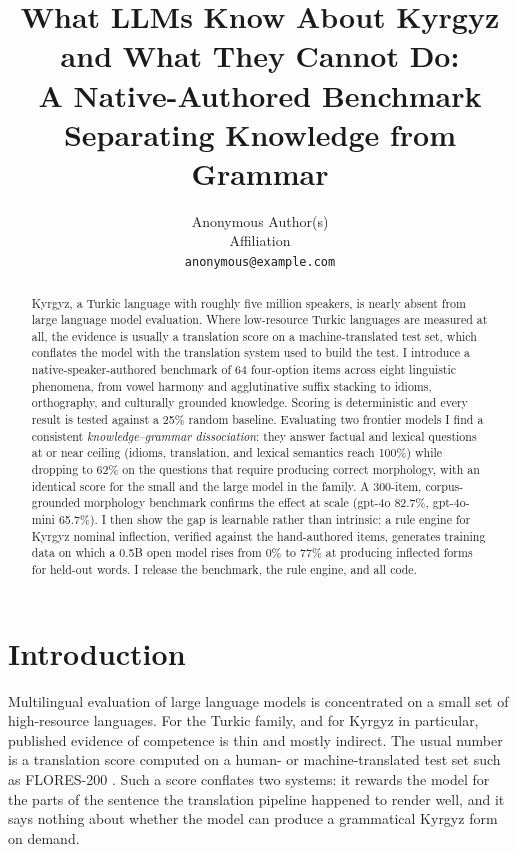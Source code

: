 \documentclass{article}
\title{What LLMs Know About Kyrgyz and What They Cannot Do:\\
A Native-Authored Benchmark Separating Knowledge from Grammar}
\author{%
  Anonymous Author(s)\\
  Affiliation\\
  \texttt{anonymous@example.com}\\
}
\begin{document}
\maketitle


\begin{abstract}
Kyrgyz, a Turkic language with roughly five million speakers, is nearly absent from
large language model evaluation. Where low-resource Turkic languages are measured at
all, the evidence is usually a translation score on a machine-translated test set,
which conflates the model with the translation system used to build the test.
I introduce a native-speaker-authored benchmark of 64 four-option items across eight
linguistic phenomena, from vowel harmony and agglutinative suffix stacking to idioms,
orthography, and culturally grounded knowledge. Scoring is deterministic and every
result is tested against a 25\% random baseline. Evaluating two frontier models I
find a consistent \emph{knowledge--grammar dissociation}: they answer factual and
lexical questions at or near ceiling (idioms, translation, and lexical semantics reach
100\%) while dropping to 62\% on the questions that require producing correct
morphology, with an identical score for the small and the large model in the family.
A 300-item, corpus-grounded morphology benchmark confirms the effect at scale
(gpt-4o 82.7\%, gpt-4o-mini 65.7\%). I then show the gap is learnable rather than
intrinsic: a rule engine for Kyrgyz nominal inflection, verified against the
hand-authored items, generates training data on which a 0.5B open model rises from
0\% to 77\% at producing inflected forms for held-out words. I release the benchmark,
the rule engine, and all code.
\end{abstract}

\section{Introduction}
\label{sec:intro}

Multilingual evaluation of large language models is concentrated on a small set of
high-resource languages. For the Turkic family, and for Kyrgyz in particular,
published evidence of competence is thin and mostly indirect. The usual number is a
translation score computed on a human- or machine-translated test set such as
FLORES-200 \cite{nllb2022}. Such a score conflates two systems: it rewards the model
for the parts
of the sentence the translation pipeline happened to render well, and it says nothing
about whether the model can produce a grammatical Kyrgyz form on demand.
\end{document}
